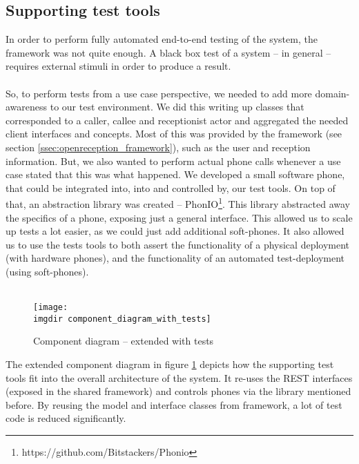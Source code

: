 \subsection{Supporting test tools}
\label{ssec:supporting-test-tools}
In order to perform fully automated end-to-end testing of the system, the framework was not quite enough. A black box test of a system -- in general -- requires external stimuli in order to produce a result.\\\\
So, to perform tests from a use case perspective, we needed to add more domain-awareness to our test environment. We did this writing up classes that corresponded to a caller, callee and receptionist actor and aggregated the needed client interfaces and concepts. Most of this was provided by the framework (see section \ref{ssec:openreception_framework}), such as the user and reception information. But, we also wanted to perform actual phone calls whenever a use case stated that this was what happened. We developed a small software phone, that could be integrated into, into and controlled by, our test tools. On top of that, an abstraction library was created -- PhonIO\footnote{https://github.com/Bitstackers/Phonio}. This library abstracted away the specifics of a phone, exposing just a general interface. This allowed us to scale up tests a lot easier, as we could just add additional soft-phones. It also allowed us to use the tests tools to both assert the functionality of a physical deployment (with hardware phones), and the functionality of an automated test-deployment (using soft-phones).\\\\
\begin{figure}[!htbp]
\centering
\texttt{[image: \\imgdir component\_diagram\_with\_tests]}
\caption{Component diagram -- extended with tests}
\label{fig:component_diagram_with_tests}
\end{figure}The extended component diagram in figure \ref{fig:component_diagram_with_tests} depicts how the supporting test tools fit into the overall architecture of the system. It re-uses the REST interfaces (exposed in the shared framework) and controls phones via the library mentioned before. By reusing the model and interface classes from framework, a lot of test code is reduced significantly.
